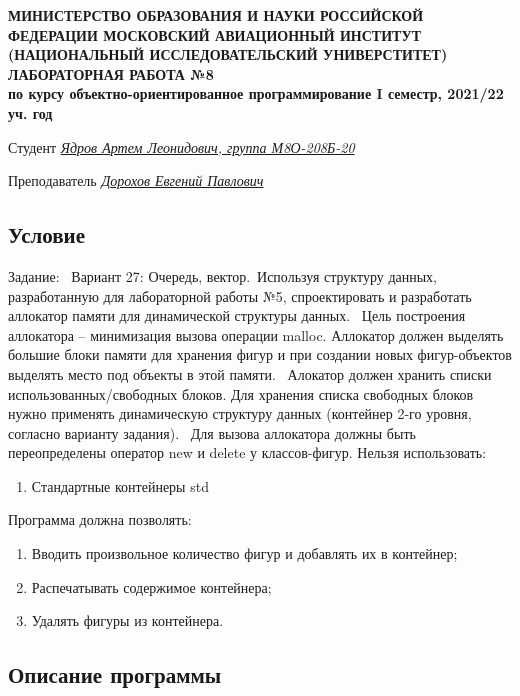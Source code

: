 \documentclass[12pt]{article}
\begin{document}
\begin{titlepage}
\begin{center}
\textbf{МИНИСТЕРСТВО ОБРАЗОВАНИЯ И НАУКИ РОССИЙСКОЙ ФЕДЕРАЦИИ
\medskip
МОСКОВСКИЙ АВИАЦИОННЫЙ ИНСТИТУТ
(НАЦИОНАЛЬНЫЙ ИССЛЕДОВАТЕЛЬСКИЙ УНИВЕРСТИТЕТ)
\vfill\vfill
{\Huge ЛАБОРАТОРНАЯ РАБОТА №8} \\
по курсу объектно-ориентированное программирование
I семестр, 2021/22 уч. год}
\end{center}
\vfill

Студент \uline{\it {Ядров Артем Леонидович, группа М8О-208Б-20}\hfill}

Преподаватель \uline{\it {Дорохов Евгений Павлович}\hfill}

\vfill
\end{titlepage}

\subsection*{Условие}

Задание: \
Вариант 27: Очередь, вектор.\
Используя структуру данных, разработанную для лабораторной работы №5, спроектировать и
разработать аллокатор памяти для динамической структуры данных.
\
Цель построения аллокатора – минимизация вызова операции malloc. Аллокатор должен
выделять большие блоки памяти для хранения фигур и при создании новых фигур-объектов
выделять место под объекты в этой памяти.
\
Алокатор должен хранить списки использованных/свободных блоков. Для хранения списка
свободных блоков нужно применять динамическую структуру данных (контейнер 2-го уровня,
согласно варианту задания).
\
Для вызова аллокатора должны быть переопределены оператор new и delete у классов-фигур.
Нельзя использовать:
\begin{enumerate}
	\item  Стандартные контейнеры std
\end{enumerate}
Программа должна позволять:
\begin{enumerate}
	\item  Вводить произвольное количество фигур и добавлять их в контейнер;
	\item Распечатывать содержимое контейнера;
	\item Удалять фигуры из контейнера.
\end{enumerate}


\subsection*{Описание программы}
\end{document}
